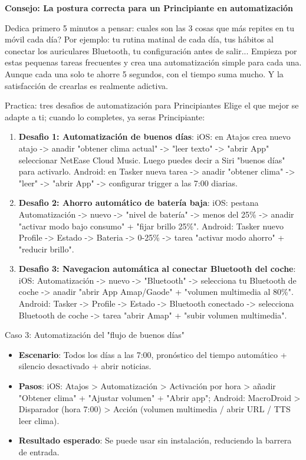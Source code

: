 \textbf{Consejo: La postura correcta para un Principiante en automatización}\par

Dedica primero 5 minutos a pensar: cuales son las 3 cosas que más repites en tu móvil cada día? Por ejemplo: tu rutina matinal de cada día, tus hábitos al conectar los auriculares Bluetooth, tu configuración antes de salir... Empieza por estas pequenas tareas frecuentes y crea una automatización simple para cada una. Aunque cada una solo te ahorre 5 segundos, con el tiempo suma mucho. Y la satisfacción de crearlas es realmente adictiva.

\begin{tcbpractice}{Practica: tres desafios de automatización para Principiantes}
Elige el que mejor se adapte a ti; cuando lo completes, ya seras Principiante:

\begin{enumerate}
  \item \textbf{Desafio 1: Automatización de buenos días}: iOS: en Atajos crea nuevo atajo -> anadir "obtener clima actual" -> "leer texto" -> "abrir App" seleccionar NetEase Cloud Music. Luego puedes decir a Siri "buenos días" para activarlo. Android: en Tasker nueva tarea -> anadir "obtener clima" -> "leer" -> "abrir App" -> configurar trigger a las 7:00 diarias.
  \item \textbf{Desafio 2: Ahorro automático de batería baja}: iOS: pestana Automatización -> nuevo -> "nivel de batería" -> menos del 25\% -> anadir "activar modo bajo consumo" + "fijar brillo 25\%". Android: Tasker nuevo Profile -> Estado -> Bateria -> 0-25\% -> tarea "activar modo ahorro" + "reducir brillo".
  \item \textbf{Desafio 3: Navegacion automática al conectar Bluetooth del coche}: iOS: Automatización -> nuevo -> "Bluetooth" -> selecciona tu Bluetooth de coche -> anadir "abrir App Amap/Gaode" + "volumen multimedia al 80\%". Android: Tasker -> Profile -> Estado -> Bluetooth conectado -> selecciona Bluetooth de coche -> tarea "abrir Amap" + "subir volumen multimedia".
\end{enumerate}

\end{tcbpractice}

\begin{tcbinfo}{Caso 3: Automatización del "flujo de buenos días"}
\begin{itemize}
  \item \textbf{Escenario}: Todos los días a las 7:00, pronóstico del tiempo automático + silencio desactivado + abrir noticias.
  \item \textbf{Pasos}: iOS: Atajos > Automatización > Activación por hora > añadir "Obtener clima" + "Ajustar volumen" + "Abrir app"; Android: MacroDroid > Disparador (hora 7:00) > Acción (volumen multimedia / abrir URL / TTS leer clima).
  \item \textbf{Resultado esperado}: Se puede usar sin instalación, reduciendo la barrera de entrada.
\end{itemize}

\end{tcbinfo}
